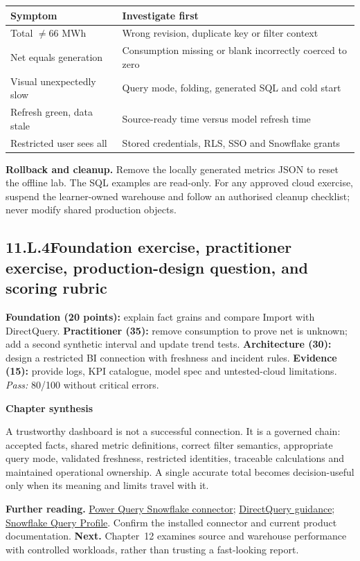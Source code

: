 \documentclass[11pt,twoside]{article}
\newcommand{\topic}[2]{\subsection*{#1\quad #2}}
\begin{document}
\begin{center}\renewcommand{\arraystretch}{1.1}\begin{tabularx}{\linewidth}{@{}p{31mm}X@{}}\toprule
\textbf{Symptom}&\textbf{Investigate first}\\\midrule
Total $\neq66$ MWh&Wrong revision, duplicate key or filter context\\
Net equals generation&Consumption missing or blank incorrectly coerced to zero\\
Visual unexpectedly slow&Query mode, folding, generated SQL and cold start\\
Refresh green, data stale&Source-ready time versus model refresh time\\
Restricted user sees all&Stored credentials, RLS, SSO and Snowflake grants\\\bottomrule\end{tabularx}\end{center}
\textbf{Rollback and cleanup.} Remove the locally generated metrics JSON to reset the offline lab. The SQL examples are read-only. For any approved cloud exercise, suspend the learner-owned warehouse and follow an authorised cleanup checklist; never modify shared production objects.
\topic{11.L.4}{Foundation exercise, practitioner exercise, production-design question, and scoring rubric}
\textbf{Foundation (20 points):} explain fact grains and compare Import with DirectQuery. \textbf{Practitioner (35):} remove consumption to prove net is unknown; add a second synthetic interval and update trend tests. \textbf{Architecture (30):} design a restricted BI connection with freshness and incident rules. \textbf{Evidence (15):} provide logs, KPI catalogue, model spec and untested-cloud limitations. \emph{Pass:} 80/100 without critical errors.
\begin{insight}\textbf{Chapter synthesis}\par
A trustworthy dashboard is not a successful connection. It is a governed chain: accepted facts, shared metric definitions, correct filter semantics, appropriate query mode, validated freshness, restricted identities, traceable calculations and maintained operational ownership. A single accurate total becomes decision-useful only when its meaning and limits travel with it.\end{insight}
\textbf{Further reading.} \href{https://learn.microsoft.com/en-us/power-query/connectors/snowflake}{Power Query Snowflake connector}; \href{https://learn.microsoft.com/en-us/power-bi/connect-data/desktop-directquery-about}{DirectQuery guidance}; \href{https://docs.snowflake.com/en/user-guide/ui-query-profile}{Snowflake Query Profile}. Confirm the installed connector and current product documentation.
\textbf{Next.} Chapter~12 examines source and warehouse performance with controlled workloads, rather than trusting a fast-looking report.
\end{document}
